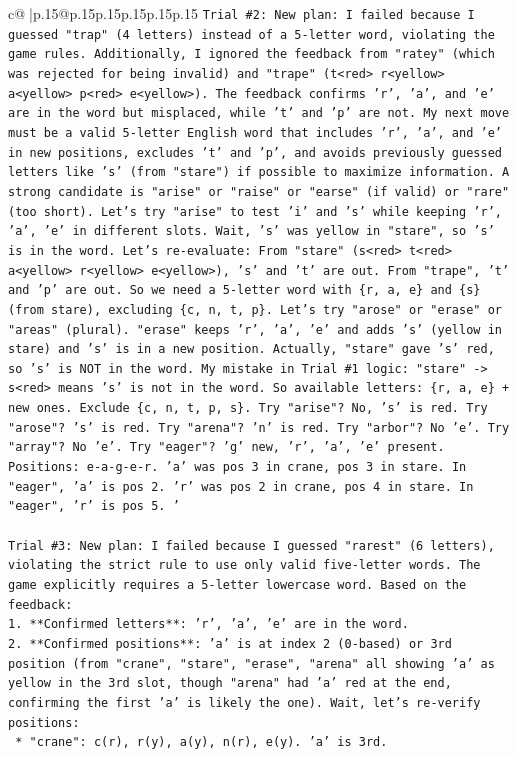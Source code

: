 \documentclass{article}
\begin{document}
{\begin{supertabular}{c@{$\;$}|p{.15\linewidth}@{}p{.15\linewidth}p{.15\linewidth}p{.15\linewidth}p{.15\linewidth}p{.15\linewidth}}
{{{\texttt{Trial \#2: New plan: I failed because I guessed "trap" (4 letters) instead of a 5{-}letter word, violating the game rules. Additionally, I ignored the feedback from "ratey" (which was rejected for being invalid) and "trape" (t<red> r<yellow> a<yellow> p<red> e<yellow>). The feedback confirms 'r', 'a', and 'e' are in the word but misplaced, while 't' and 'p' are not. My next move must be a valid 5{-}letter English word that includes 'r', 'a', and 'e' in new positions, excludes 't' and 'p', and avoids previously guessed letters like 's' (from "stare") if possible to maximize information. A strong candidate is "arise" or "raise" or "earse" (if valid) or "rare" (too short). Let's try "arise" to test 'i' and 's' while keeping 'r', 'a', 'e' in different slots. Wait, 's' was yellow in "stare", so 's' is in the word. Let's re{-}evaluate: From "stare" (s<red> t<red> a<yellow> r<yellow> e<yellow>), 's' and 't' are out. From "trape", 't' and 'p' are out. So we need a 5{-}letter word with \{r, a, e\} and \{s\} (from stare), excluding \{c, n, t, p\}. Let's try "arose" or "erase" or "areas" (plural). "erase" keeps 'r', 'a', 'e' and adds 's' (yellow in stare) and 's' is in a new position. Actually, "stare" gave 's' red, so 's' is NOT in the word. My mistake in Trial \#1 logic: "stare" {-}> s<red> means 's' is not in the word. So available letters: \{r, a, e\} + new ones. Exclude \{c, n, t, p, s\}. Try "arise"? No, 's' is red. Try "arose"? 's' is red. Try "arena"? 'n' is red. Try "arbor"? No 'e'. Try "array"? No 'e'. Try "eager"? 'g' new, 'r', 'a', 'e' present. Positions: e{-}a{-}g{-}e{-}r. 'a' was pos 3 in crane, pos 3 in stare. In "eager", 'a' is pos 2. 'r' was pos 2 in crane, pos 4 in stare. In "eager", 'r' is pos 5. '} \\
\\ 
\texttt{Trial \#3: New plan: I failed because I guessed "rarest" (6 letters), violating the strict rule to use only valid five{-}letter words. The game explicitly requires a 5{-}letter lowercase word. Based on the feedback:} \\
\texttt{1.  **Confirmed letters**: 'r', 'a', 'e' are in the word.} \\
\texttt{2.  **Confirmed positions**: 'a' is at index 2 (0{-}based) or 3rd position (from "crane", "stare", "erase", "arena" all showing 'a' as yellow in the 3rd slot, though "arena" had 'a' red at the end, confirming the first 'a' is likely the one). Wait, let's re{-}verify positions:} \\
\texttt{    *   "crane": c(r), r(y), a(y), n(r), e(y). 'a' is 3rd.} \\
}}}
\end{supertabular}}
\end{document}
